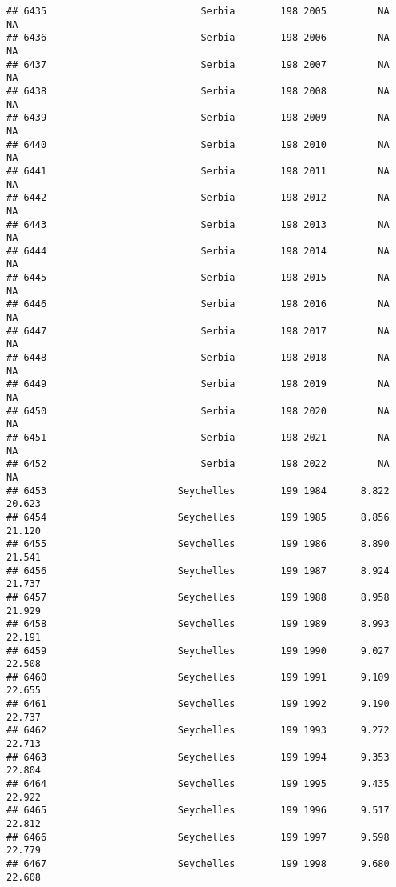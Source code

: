 \documentclass[
]{article}
\begin{document}
\begin{verbatim}
## 6435                           Serbia        198 2005         NA         NA
## 6436                           Serbia        198 2006         NA         NA
## 6437                           Serbia        198 2007         NA         NA
## 6438                           Serbia        198 2008         NA         NA
## 6439                           Serbia        198 2009         NA         NA
## 6440                           Serbia        198 2010         NA         NA
## 6441                           Serbia        198 2011         NA         NA
## 6442                           Serbia        198 2012         NA         NA
## 6443                           Serbia        198 2013         NA         NA
## 6444                           Serbia        198 2014         NA         NA
## 6445                           Serbia        198 2015         NA         NA
## 6446                           Serbia        198 2016         NA         NA
## 6447                           Serbia        198 2017         NA         NA
## 6448                           Serbia        198 2018         NA         NA
## 6449                           Serbia        198 2019         NA         NA
## 6450                           Serbia        198 2020         NA         NA
## 6451                           Serbia        198 2021         NA         NA
## 6452                           Serbia        198 2022         NA         NA
## 6453                       Seychelles        199 1984      8.822     20.623
## 6454                       Seychelles        199 1985      8.856     21.120
## 6455                       Seychelles        199 1986      8.890     21.541
## 6456                       Seychelles        199 1987      8.924     21.737
## 6457                       Seychelles        199 1988      8.958     21.929
## 6458                       Seychelles        199 1989      8.993     22.191
## 6459                       Seychelles        199 1990      9.027     22.508
## 6460                       Seychelles        199 1991      9.109     22.655
## 6461                       Seychelles        199 1992      9.190     22.737
## 6462                       Seychelles        199 1993      9.272     22.713
## 6463                       Seychelles        199 1994      9.353     22.804
## 6464                       Seychelles        199 1995      9.435     22.922
## 6465                       Seychelles        199 1996      9.517     22.812
## 6466                       Seychelles        199 1997      9.598     22.779
## 6467                       Seychelles        199 1998      9.680     22.608

\end{verbatim}
\end{document}
